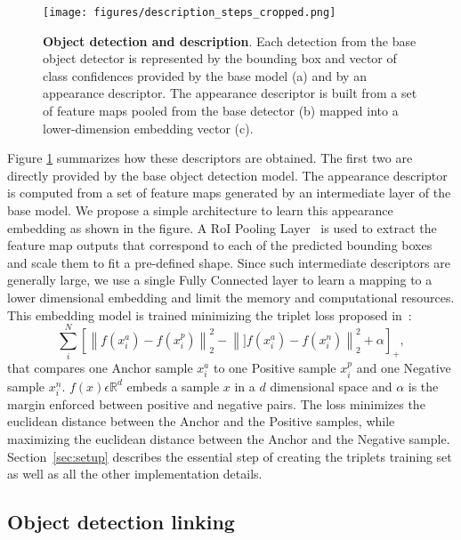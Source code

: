 \documentclass[letterpaper, 10 pt, conference]{ieeeconf}
\begin{document}
\begin{figure}[!tb]
\centering
\texttt{[image: figures/description\_steps\_cropped.png]}
\caption{
\textbf{Object detection and description}. 
Each detection from the base object detector is represented by the bounding box and vector of class confidences provided by the base model (a) and by an appearance descriptor. 
The appearance descriptor is built from a set of feature maps pooled from the base detector (b) mapped into a lower-dimension embedding vector (c). 
}
\label{fig:descriptors}
\end{figure}

Figure \ref{fig:descriptors} summarizes how these descriptors are obtained. The first two are directly provided by the base object detection model. The appearance descriptor is computed from a set of feature maps generated by an intermediate layer of the base model. 
We propose a simple architecture to learn this appearance embedding as shown in the figure. A RoI Pooling Layer~\cite{ren2015faster} is used to extract 
the feature map outputs that correspond to each of the predicted bounding boxes and scale them to fit a pre-defined shape. 
Since such intermediate descriptors are generally large, we use a single Fully Connected layer to learn a mapping to a lower dimensional embedding and limit the memory and computational resources. 
This embedding model is trained minimizing the triplet loss proposed in~\cite{Schroff_2015_CVPR}:
\begin{equation}
\label{eq:triplet-loss}
\sum^N_i \left [ \left \| f(x^{a}_{i}) - f(x^{p}_{i}) \right\|^{2}_{2} - \left \| ] f(x^{a}_{i}) - f(x^{n}_{i}) \right\|^{2}_{2} + \alpha \right ]_+, 
\end{equation}\noindent that compares one Anchor sample \(x^{a}_{i}\) to one Positive sample \(x^{p}_{i}\) and one Negative sample \(x^{n}_{i}\). 
$f(x)\epsilon \mathbb{R} ^d$ embeds a sample $x$ in a $d$ dimensional space and $\alpha$ is the margin enforced between positive and
negative pairs.
The loss minimizes the euclidean distance between the Anchor and the Positive samples, while maximizing the euclidean distance between the Anchor and the Negative sample.  Section~\ref{sec:setup} 
describes the essential step of creating the triplets training set as well as all the other implementation details.


\subsection{Object detection linking}
\label{sec:objlinking}
\end{document}
